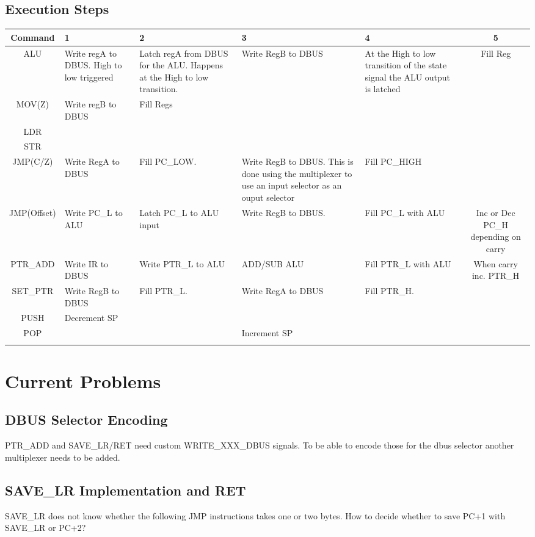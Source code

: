 \documentclass[a4paper, 12pt]{article}
\begin{document}
	\subsection{Execution Steps}
	{\tiny
	\begin{center}
		\begin{tabular}{|c|p{2cm}|p{3cm}|p{3cm}|p{2cm}|c|}
			\hline
			Command & 1 & 2 & 3 & 4 & 5 \\ \hline
			ALU & Write regA to DBUS. High to low triggered & Latch regA from DBUS for the ALU. Happens at the High to low transition. & Write RegB to DBUS & At the High to low transition of the state signal the ALU output is latched & Fill Reg\\ \hline
			MOV(Z) & Write regB to DBUS & Fill Regs & & &\\ \hline
			LDR & & & & & \\ \hline
			STR & & & & & \\ \hline
			JMP(C/Z) & Write RegA to DBUS & Fill PC\_LOW. & Write RegB to DBUS. This is done using the multiplexer to use an input selector as an ouput selector & Fill PC\_HIGH & \\ \hline
			JMP(Offset) & Write PC\_L to ALU & Latch PC\_L to ALU input & Write RegB to DBUS. & Fill PC\_L with ALU & Inc or Dec PC\_H depending on carry\\ \hline
			PTR\_ADD & Write IR to DBUS & Write PTR\_L to ALU & ADD/SUB ALU& Fill PTR\_L with ALU & When carry inc. PTR\_H\\ \hline
			SET\_PTR & Write RegB to DBUS & Fill PTR\_L. & Write RegA to DBUS & Fill PTR\_H. & \\ \hline
			PUSH & Decrement SP & & & & \\ \hline
			POP & & & Increment SP & & \\ \hline
			& & & & & \\ \hline
		\end{tabular}
	\end{center}
	}
	\newpage
	\section{Current Problems}
	\subsection{DBUS Selector Encoding}
	PTR\_ADD and SAVE\_LR/RET need custom WRITE\_XXX\_DBUS signals. To be able to encode those for the dbus selector another multiplexer needs to be added.
	\subsection{SAVE\_LR Implementation and RET}
	SAVE\_LR does not know whether the following JMP instructions takes one or two bytes. How to decide whether to save PC+1 with SAVE\_LR or PC+2?
\end{document}
